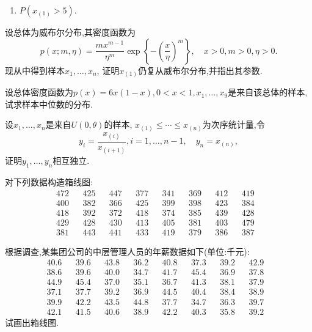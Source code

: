 \begin{xiti}
\begin{enumerate}
\item $P(x_{(1)}>5)$.
\end{enumerate}
\item 设总体为威布尔分布,其密度函数为
\[p(x;m,\eta)=\frac{mx^{m-1}}{\eta^m}\exp\left\{ -\left( \frac{x}{\eta} \right) ^m \right\},\quad x>0,m>0,\eta>0.\]
现从中得到样本$x_1,\dotsc,x_n$, 证明$x_{(1)}$仍复从威布尔分布,并指出其参数.
\item 设总体密度函数为$p(x)=6x(1-x),0<x<1,x_1,\dotsc,x_9$是来自该总体的样本,试求样本中位数的分布.
\item 设$x_1,\dotsc,x_n$是来自$U(0,\theta)$的样本, $x_{(1)}\leq\dotsb\leq x_{(n)}$为次序统计量,令
\[y_i=\frac{x_{(i)}}{x_{(i+1)}},i=1,\dotsc,n-1,\quad y_n=x_{(n)},\]
证明$y_1,\dotsc,y_n$相互独立.
\item 对下列数据构造箱线图:
\begin{align*}
472&&425&&447&&377&&341&&369&&412&&419&\\
400&&382&&366&&425&&399&&398&&423&&384&\\
418&&392&&372&&418&&374&&385&&439&&428&\\
429&&428&&430&&413&&405&&381&&403&&479&\\
381&&443&&441&&433&&419&&379&&386&&387&
\end{align*}
\item 根据调查,某集团公司的中层管理人员的年薪数据如下(单位:千元):
\begin{align*}
40.6&&39.6&&43.8&&36.2&&40.8&&37.3&&39.2&&42.9&\\
38.6&&39.6&&40.0&&34.7&&41.7&&45.4&&36.9&&37.8&\\
44.9&&45.4&&37.0&&35.1&&36.7&&41.3&&38.1&&37.9&\\
37.1&&37.7&&39.2&&36.9&&44.5&&40.4&&38.4&&38.9&\\
39.9&&42.2&&43.5&&44.8&&37.7&&34.7&&36.3&&39.7&\\
42.1&&41.5&&40.6&&38.9&&42.2&&40.3&&35.8&&39.2&
\end{align*}
试画出箱线图.
\end{xiti}

